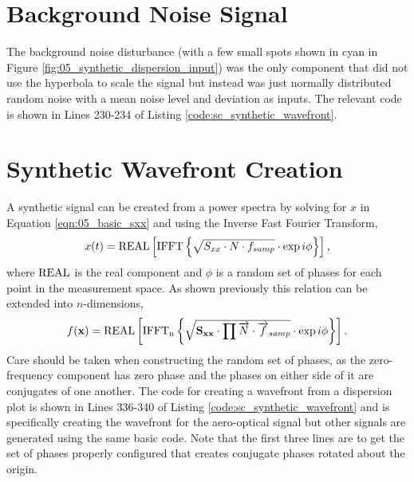 \section{Background Noise Signal}
The background noise disturbance (with a few small spots shown in cyan in Figure \ref{fig:05_synthetic_dispersion_input}) was the only component that did not use the hyperbola to scale the signal but instead was just normally distributed random noise with a mean noise level and deviation as inputs.
The relevant code is shown in Lines 230-234 of Listing \ref{code:sc_synthetic_wavefront}.

\section{Synthetic Wavefront Creation}
A synthetic signal can be created from a power spectra by solving for $x$ in Equation \ref{eqn:05_basic_sxx} and using the Inverse Fast Fourier Transform,
\begin{equation}
 x(t) = \operatorname{REAL}\left[\operatorname{IFFT}\left\{\sqrt{S_{xx}\cdot N\cdot f_{samp}}\cdot\exp{i\phi}\right\}\right] \textrm{,}
 \label{eqn:05_ifft}
\end{equation}
where $\operatorname{REAL}$ is the real component and $\phi$ is a random set of phases for each point in the measurement space.
As shown previously this relation can be extended into $n$-dimensions,
\begin{equation}
 f(\mathbf{x}) = \operatorname{REAL}\left[\operatorname{IFFT_n}\left\{\sqrt{\mathbf{S_{xx}}\cdot\prod{\overrightarrow{N}\cdot \overrightarrow{f}_{samp}}}\cdot\exp{i\mathbf{\phi}}\right\}\right] \textrm{.}
 \label{eqn:05_ifftn}
\end{equation}
Care should be taken when constructing the random set of phases, as the zero-frequency component has zero phase and the phases on either side of it are conjugates of one another.
The code for creating a wavefront from a dispersion plot is shown in Lines 336-340 of Listing \ref{code:sc_synthetic_wavefront} and is specifically creating the wavefront for the aero-optical signal but other signals are generated using the same basic code.
Note that the first three lines are to get the set of phases properly configured that creates conjugate phases rotated about the origin.

